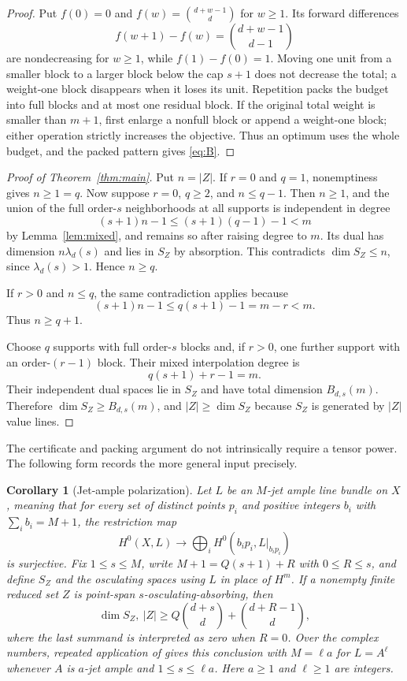 \documentclass[11pt]{article}
\newtheorem{corollary}[theorem]{Corollary}
\theoremstyle{definition}
\theoremstyle{remark}
\theoremstyle{plain}
\begin{document}
\begin{proof}
Put $f(0)=0$ and $f(w)=\binom{d+w-1}{d}$ for $w\geq1$.  Its forward differences
\[
 f(w+1)-f(w)=\binom{d+w-1}{d-1}
\]
are nondecreasing for $w\geq1$, while $f(1)-f(0)=1$.  Moving one unit from a
smaller block to a larger block below the cap $s+1$ does not decrease the
total; a weight-one block disappears when it loses its unit.  Repetition packs
the budget into full blocks and at most one residual block.  If the original total
weight is smaller than $m+1$, first enlarge a nonfull block or append a
weight-one block; either operation strictly increases the objective.  Thus an
optimum uses the whole budget, and the packed pattern gives \eqref{eq:B}.
\end{proof}

\begin{proof}[Proof of Theorem~\ref{thm:main}]
Put $n=|Z|$.  If $r=0$ and $q=1$, nonemptiness gives $n\geq1=q$.  Now
suppose $r=0$, $q\geq2$, and $n\leq q-1$.  Then $n\geq1$, and the union of the full
order-$s$ neighborhoods at all supports is independent in degree
\[
 (s+1)n-1\leq(s+1)(q-1)-1<m
\]
by Lemma~\ref{lem:mixed}, and remains so after raising degree to $m$.
Its dual has dimension $n\lambda_d(s)$ and lies in $S_Z$ by absorption.
This contradicts $\dim S_Z\leq n$, since $\lambda_d(s)>1$.  Hence $n\geq q$.

If $r>0$ and $n\leq q$, the same contradiction applies because
\[
 (s+1)n-1\leq q(s+1)-1=m-r<m.
\]
Thus $n\geq q+1$.

Choose $q$ supports with full order-$s$ blocks and, if $r>0$, one further
support with an order-$(r-1)$ block.  Their mixed interpolation degree is
\[
 q(s+1)+r-1=m.
\]
Their independent dual spaces lie in $S_Z$ and have total dimension
$B_{d,s}(m)$.  Therefore $\dim S_Z\geq B_{d,s}(m)$, and
$|Z|\geq\dim S_Z$ because $S_Z$ is generated by $|Z|$ value lines.
\end{proof}

The certificate and packing argument do not intrinsically require a tensor
power.  The following form records the more general input precisely.

\begin{corollary}[Jet-ample polarization]\label{cor:jetample}
Let $L$ be an $M$-jet ample line bundle on $X$, meaning that for every set of
distinct points $p_i$ and positive integers $b_i$ with
$\sum_i b_i=M+1$, the restriction map
\[
 H^0(X,L)\longrightarrow
 \bigoplus_i H^0\!\left(b_i p_i,L|_{b_i p_i}\right)
\]
is surjective.  Fix $1\leq s\leq M$, write
$M+1=Q(s+1)+R$ with $0\leq R\leq s$, and define $S_Z$ and the osculating
spaces using $L$ in place of $H^m$.  If a nonempty finite reduced set $Z$ is
point-span $s$-osculating-absorbing, then
\[
 \dim S_Z,\ |Z|\geq
 Q\binom{d+s}{d}+\binom{d+R-1}{d},
\]
where the last summand is interpreted as zero when $R=0$.
Over the complex numbers, repeated application of
\cite[Proposition~2.3]{BDRS1999} gives this conclusion with $M=\ell a$ for
$L=A^{\ell}$ whenever $A$ is $a$-jet ample and $1\leq s\leq\ell a$.
Here $a\geq1$ and $\ell\geq1$ are integers.
\end{corollary}
\end{document}
